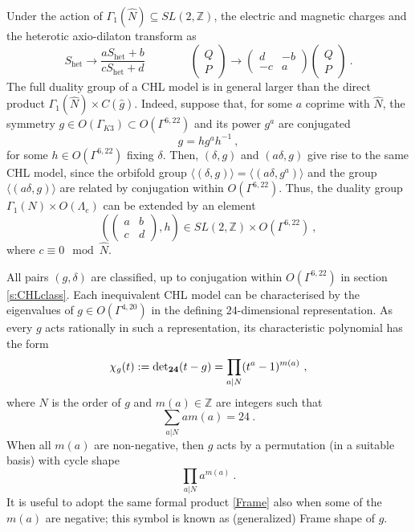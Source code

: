\documentclass[a4paper,11pt]{article}
\newcommand{\ZZ}{\mathbb{Z}}
\numberwithin{equation}{section}
\def\be{\begin{equation}}
\def\ee{\end{equation}}
\begin{document}
Under the action of $\Gamma_1(\hat N)\subseteq SL(2,\ZZ)$, the electric and magnetic charges and the heterotic axio-dilaton transform as
\be  S_{\text{het}}\to \frac{aS_{\text{het}}+b}{cS_{\text{het}}+d}\qquad\qquad \begin{pmatrix}
Q\\ P
\end{pmatrix}\to \begin{pmatrix}
d & -b\\ -c & a
\end{pmatrix}\begin{pmatrix}
Q\\ P
\end{pmatrix}\ .
\ee
The full duality group of a CHL model is in general larger than the direct product $\Gamma_1(\hat N)\times C(\hat g)$. Indeed, suppose that, for some $a$ coprime with $\hat N$, the symmetry $g\in O(\Gamma_{K3})\subset O(\Gamma^{6,22})$ and its power $g^a$  are conjugated 
\be g=hg^ah^{-1}\ ,
\ee
for some $h\in O(\Gamma^{6,22})$ fixing $\delta$.  Then, $(\delta,g)$ and $(a\delta,g)$  give rise to the same CHL model, since the orbifold group $\langle (\delta,g)\rangle =\langle (a\delta,g^a)\rangle$ and the group $\langle(a\delta,g)\rangle$ are related by conjugation within $O(\Gamma^{6,22})$. Thus, the duality group $\Gamma_1(N)\times O(\Lambda_e)$ can be extended by an element \be (\left(\begin{smallmatrix}
a & b \\ c & d
\end{smallmatrix}\right),h)\in SL(2,\ZZ)\times O(\Gamma^{6,22})\ ,\ee where $c\equiv 0\mod \hat N$.

\medskip

All  pairs $(g,\delta)$ are classified, up to conjugation within $O(\Gamma^{6,22})$ in section \ref{s:CHLclass}. Each inequivalent CHL model can be characterised by the eigenvalues of $g\in O(\Gamma^{4,20})$ in the defining $24$-dimensional representation. As every $g$ acts rationally in such a representation, its characteristic polynomial has the form
\be \chi_g(t):=\det\nolimits_{\bf 24}(t-g)=\prod_{a|N} (t^a-1)^{m(a)}\ ,
\ee where $N$ is the order of $g$ and $m(a)\in \ZZ$ are integers such that 
\be \sum_{a|N} am(a)=24\ .\ee When all $m(a)$ are non-negative, then $g$ acts by a permutation (in a suitable basis) with cycle shape \be\label{Frame} \prod_{a|N} a^{m(a)}\ .\ee It is useful to adopt the same formal product \eqref{Frame}  also when some of the $m(a)$ are negative; this symbol is known as (generalized) Frame shape of $g$.
\end{document}
